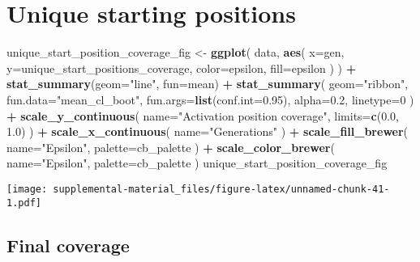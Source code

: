 \documentclass[]{book}
\newenvironment{Shaded}{\begin{snugshade}}{\end{snugshade}}
\newcommand{\DataTypeTok}[1]{\textcolor[rgb]{0.13,0.29,0.53}{#1}}
\newcommand{\DecValTok}[1]{\textcolor[rgb]{0.00,0.00,0.81}{#1}}
\newcommand{\FloatTok}[1]{\textcolor[rgb]{0.00,0.00,0.81}{#1}}
\newcommand{\KeywordTok}[1]{\textcolor[rgb]{0.13,0.29,0.53}{\textbf{#1}}}
\newcommand{\NormalTok}[1]{#1}
\newcommand{\OperatorTok}[1]{\textcolor[rgb]{0.81,0.36,0.00}{\textbf{#1}}}
\newcommand{\StringTok}[1]{\textcolor[rgb]{0.31,0.60,0.02}{#1}}
\begin{document}
\hypertarget{unique-starting-positions-3}{%
\section{Unique starting positions}\label{unique-starting-positions-3}}

\begin{Shaded}
\begin{Highlighting}[]
\NormalTok{unique_start_position_coverage_fig <-}\StringTok{ }\KeywordTok{ggplot}\NormalTok{(}
\NormalTok{    data,}
    \KeywordTok{aes}\NormalTok{(}
      \DataTypeTok{x=}\NormalTok{gen,}
      \DataTypeTok{y=}\NormalTok{unique_start_positions_coverage,}
      \DataTypeTok{color=}\NormalTok{epsilon,}
      \DataTypeTok{fill=}\NormalTok{epsilon}
\NormalTok{    )}
\NormalTok{  ) }\OperatorTok{+}
\StringTok{  }\KeywordTok{stat_summary}\NormalTok{(}\DataTypeTok{geom=}\StringTok{"line"}\NormalTok{, }\DataTypeTok{fun=}\NormalTok{mean) }\OperatorTok{+}
\StringTok{  }\KeywordTok{stat_summary}\NormalTok{(}
    \DataTypeTok{geom=}\StringTok{"ribbon"}\NormalTok{,}
    \DataTypeTok{fun.data=}\StringTok{"mean_cl_boot"}\NormalTok{,}
    \DataTypeTok{fun.args=}\KeywordTok{list}\NormalTok{(}\DataTypeTok{conf.int=}\FloatTok{0.95}\NormalTok{),}
    \DataTypeTok{alpha=}\FloatTok{0.2}\NormalTok{,}
    \DataTypeTok{linetype=}\DecValTok{0}
\NormalTok{  ) }\OperatorTok{+}
\StringTok{  }\KeywordTok{scale_y_continuous}\NormalTok{(}
    \DataTypeTok{name=}\StringTok{"Activation position coverage"}\NormalTok{,}
    \DataTypeTok{limits=}\KeywordTok{c}\NormalTok{(}\FloatTok{0.0}\NormalTok{, }\FloatTok{1.0}\NormalTok{)}
\NormalTok{  ) }\OperatorTok{+}
\StringTok{  }\KeywordTok{scale_x_continuous}\NormalTok{(}
    \DataTypeTok{name=}\StringTok{"Generations"}
\NormalTok{  ) }\OperatorTok{+}
\StringTok{  }\KeywordTok{scale_fill_brewer}\NormalTok{(}
    \DataTypeTok{name=}\StringTok{"Epsilon"}\NormalTok{,}
    \DataTypeTok{palette=}\NormalTok{cb_palette}
\NormalTok{  ) }\OperatorTok{+}
\StringTok{  }\KeywordTok{scale_color_brewer}\NormalTok{(}
    \DataTypeTok{name=}\StringTok{"Epsilon"}\NormalTok{,}
    \DataTypeTok{palette=}\NormalTok{cb_palette}
\NormalTok{  )}
\NormalTok{unique_start_position_coverage_fig}
\end{Highlighting}
\end{Shaded}

\texttt{[image: supplemental-material\_files/figure-latex/unnamed-chunk-41-1.pdf]}

\hypertarget{final-coverage}{%
\subsection{Final coverage}\label{final-coverage}}
\end{document}

